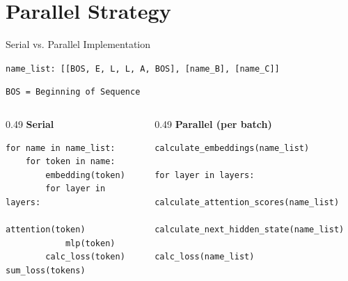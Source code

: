 \documentclass[aspectratio=169]{beamer}
\begin{document}
\section{Parallel Strategy}
\begin{frame}[fragile]{Serial vs. Parallel Implementation}
    \vspace{0.05cm}
    {\large\texttt{name\_list: [[BOS, E, L, L, A, BOS], [name\_B], [name\_C]]}\par}
    \vspace{0.2cm}
    {\large\texttt{BOS = Beginning of Sequence}\par}

    \vspace{0.3cm}
    \begin{columns}[T,onlytextwidth]

        \begin{column}{0.49\textwidth}
        \textbf{Serial} 
\begin{lstlisting}
for name in name_list:
    for token in name:
        embedding(token)
        for layer in layers:
            attention(token)
            mlp(token)
        calc_loss(token)
sum_loss(tokens)
\end{lstlisting}
        \end{column}

        \begin{column}{0.49\textwidth}
        \textbf{Parallel (per batch)}
\begin{lstlisting}
calculate_embeddings(name_list)

for layer in layers:
    calculate_attention_scores(name_list)
    calculate_next_hidden_state(name_list)

calc_loss(name_list) 
\end{lstlisting}
        \end{column}

    \end{columns}
\end{frame}
\end{document}
